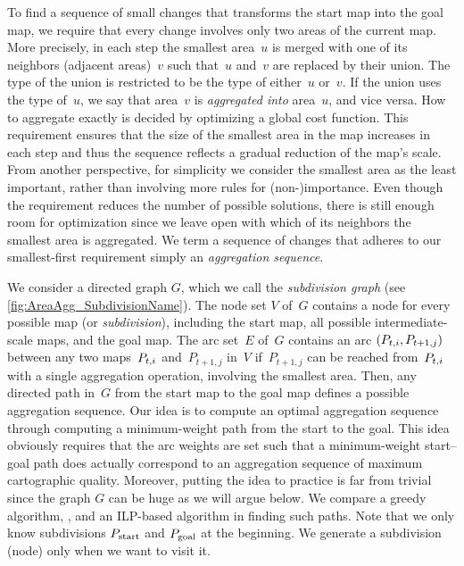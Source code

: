 \documentclass[acmsmall,natbib=false]{acmart}
\begin{document}
To find a sequence of small changes 
that transforms the start map into the goal map,
we require that 
every change involves only two areas of the current map.
More precisely, in each step the smallest area~$u$ is merged 
with one of its neighbors (adjacent areas)~$v$
such that~$u$ and~$v$ are replaced by their union.
The type of the union is restricted to be 
the type of either~$u$ or~$v$.
If the union uses the type of~$u$, 
we say that area~$v$ is \emph{aggregated into} area~$u$, 
and vice versa. 
How to aggregate exactly is decided by 
optimizing a global cost function.
This requirement ensures that the 
size of the smallest area in the map increases in each step
and thus the sequence reflects a gradual reduction of the 
map's scale.
From another perspective, 
for simplicity we consider 
the smallest area as the least important, 
rather than involving more rules for (non-)importance. 
Even though the requirement reduces the number of possible 
solutions,
there is still enough room for optimization 
since we leave open with
which of its neighbors the smallest area is aggregated.
We term a sequence of changes 
that adheres to our smallest-first requirement simply 
an \emph{aggregation sequence}.


We consider a directed graph $G$, 
which we call the \emph{subdivision graph} 
(see \fig\ref{fig:AreaAgg_SubdivisionName}). 
The node set $V$ of~$G$ contains a node for every
possible map (or \emph{subdivision}), including the start map, all
possible intermediate-scale maps, and the goal map.
The arc set~$E$ of~$G$ contains an arc $(P_{t,i}, P_{t+1,j})$ 
between any two maps~$P_{t,i}$ and~$P_{t+1,j}$ in~$V$ 
if~$P_{t+1,j}$ can be reached from~$P_{t,i}$ 
with a single aggregation operation,
involving the smallest area.
Then, any directed path in~$G$ from the start map to the goal map
defines a possible aggregation sequence.
Our idea is to compute an optimal aggregation sequence through 
computing a minimum-weight path from the start to the goal.
This idea obviously requires that the arc weights are 
set such that a minimum-weight start--goal
path does actually correspond to an aggregation sequence of 
maximum cartographic quality.  
Moreover, putting the idea to practice is far from trivial 
since the graph $G$ can be huge as we will argue below.
We compare a greedy algorithm, \Astar, and an ILP-based algorithm
in finding such paths.
Note that we only know subdivisions 
$P_\mathrm{start}$ and $P_\mathrm{goal}$ at the beginning.
We generate a subdivision (node) only when we want to visit it.
\end{document}
